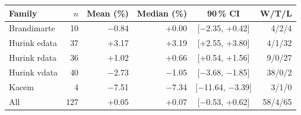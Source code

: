 \begin{tabular}{@{}lrrrcr@{}}
\toprule
Family & $n$ & Mean (\%) & Median (\%) & 90\,\% CI & W/T/L \\
\midrule
Brandimarte & 10 & $-$0.84 & +0.00 & [$-$2.35, +0.42] & 4/2/4 \\
Hurink edata & 37 & +3.17 & +3.19 & [+2.55, +3.80] & 4/1/32 \\
Hurink rdata & 36 & +1.02 & +0.66 & [+0.54, +1.56] & 9/0/27 \\
Hurink vdata & 40 & $-$2.73 & $-$1.05 & [$-$3.68, $-$1.85] & 38/0/2 \\
Kacem & 4 & $-$7.51 & $-$7.34 & [$-$11.64, $-$3.39] & 3/1/0 \\
\midrule
All & 127 & +0.05 & +0.07 & [$-$0.53, +0.62] & 58/4/65 \\
\bottomrule
\end{tabular}
